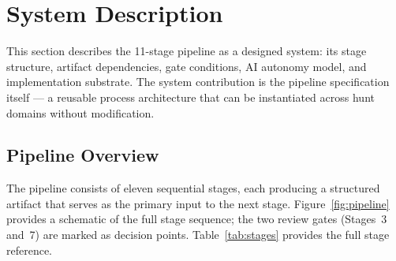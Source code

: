 \section{System Description}
\label{sec:system}

This section describes the 11-stage pipeline as a designed system: its stage structure,
artifact dependencies, gate conditions, AI autonomy model, and implementation substrate.
The system contribution is the pipeline specification itself --- a reusable process
architecture that can be instantiated across hunt domains without modification.

\subsection{Pipeline Overview}
\label{sec:pipeline-overview}

The pipeline consists of eleven sequential stages, each producing a structured artifact
that serves as the primary input to the next stage. Figure~\ref{fig:pipeline} provides a
schematic of the full stage sequence; the two review gates (Stages~3 and~7) are marked as
decision points. Table~\ref{tab:stages} provides the full stage reference.

